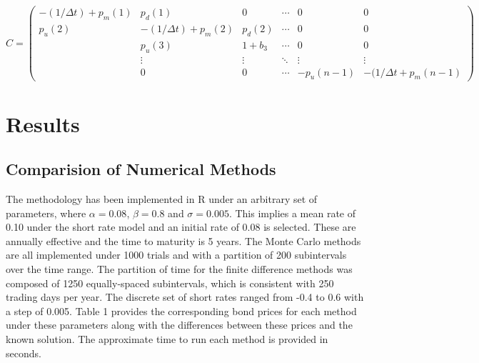 \documentclass[12pt,a4paper]{article}
\begin{document}
$$C=\left( \begin{array}{cccccc}
-(1/\Delta t)+p_m(1) & p_d(1) & 0 & \cdots  & 0 & 0\\
p_u(2) & -(1/\Delta t)+p_m(2) & p_d(2) &\cdots & 0 & 0 \\
& p_u(3) & 1+b_{3} & \cdots & 0 & 0  \\
& \vdots &\vdots & \ddots & \vdots & \vdots \\ 
& 0 & 0 & \cdots & -p_u(n-1) & -(1/\Delta t+p_m(n-1) \end{array} \right) 
$$



\newpage
\section{Results}
\label{sec: Results}

\subsection{Comparision of Numerical Methods}
\label{subsec: Compar}
The methodology has been implemented in R under an arbitrary set of parameters, where $\alpha = 0.08$, $\beta = 0.8$ and $\sigma=0.005$. This implies a mean rate of 0.10 under the short rate model and an initial rate of 0.08 is selected. These are annually effective and the time to maturity is 5 years. The Monte Carlo methods are all implemented under 1000 trials and with a partition of 200 subintervals over the time range. The partition of time for the finite difference methods was composed of 1250 equally-spaced subintervals, which is consistent with 250 trading days per year. The discrete set of short rates ranged from -0.4 to 0.6 with a step of 0.005. Table 1 provides the corresponding bond prices for each method under these parameters along with the differences between these prices and the known solution. The approximate time to run each method is provided in seconds.
\end{document}
